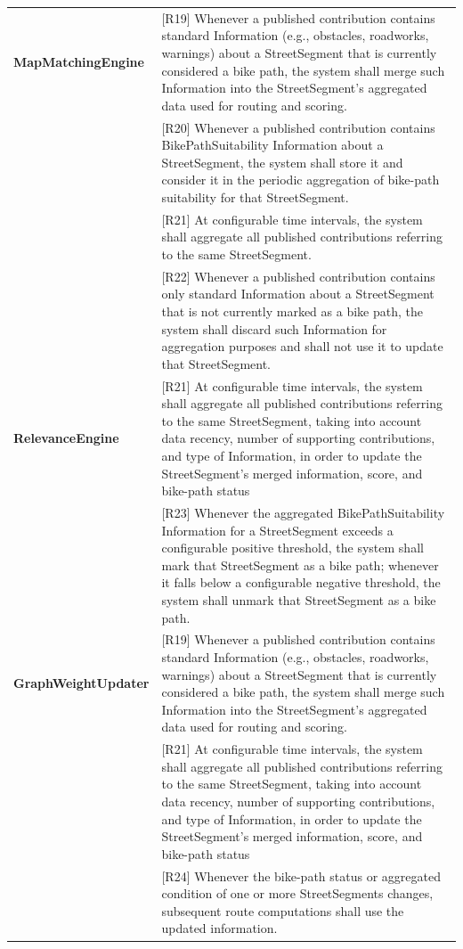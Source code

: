 \begin{center}
\begin{longtable}{p{0.30\linewidth}p{0.70\linewidth}}
\textbf{MapMatchingEngine} &
[R19] Whenever a published contribution contains standard Information (e.g., obstacles, roadworks, warnings) about a StreetSegment that is currently considered a bike path, the system shall merge such Information into the StreetSegment’s aggregated data used for routing and scoring. \\
& [R20] Whenever a published contribution contains BikePathSuitability Information about a StreetSegment, the system shall store it and consider it in the periodic aggregation of bike-path suitability for that StreetSegment. \\
& [R21] At configurable time intervals, the system shall aggregate all published contributions referring to the same StreetSegment. \\
& [R22] Whenever a published contribution contains only standard Information about a StreetSegment that is not currently marked as a bike path, the system shall discard such Information for aggregation purposes and shall not use it to update that StreetSegment. \\
\hline

\textbf{RelevanceEngine} &
[R21] At configurable time intervals, the system shall aggregate all published contributions
referring to the same StreetSegment, taking into account data recency, number of supporting contributions, and type of Information, in order to update the StreetSegment’s merged
information, score, and bike-path status \\
& [R23] Whenever the aggregated BikePathSuitability Information for a StreetSegment exceeds a configurable positive threshold, the system shall mark that StreetSegment as a bike path; whenever it falls below a configurable negative threshold, the system shall unmark that StreetSegment as a bike path. \\

\hline

\textbf{GraphWeightUpdater} &
[R19]  Whenever a published contribution contains standard Information (e.g., obstacles, roadworks, warnings) about a StreetSegment that is currently considered a bike path, the system
shall merge such Information into the StreetSegment’s aggregated data used for routing and scoring. \\
&[R21] At configurable time intervals, the system shall aggregate all published contributions
referring to the same StreetSegment, taking into account data recency, number of supporting contributions, and type of Information, in order to update the StreetSegment’s merged
information, score, and bike-path status\\
& [R24] Whenever the bike-path status or aggregated condition of one or more StreetSegments changes, subsequent route computations shall use the updated information. \\
\hline


\end{longtable}
\end{center}
